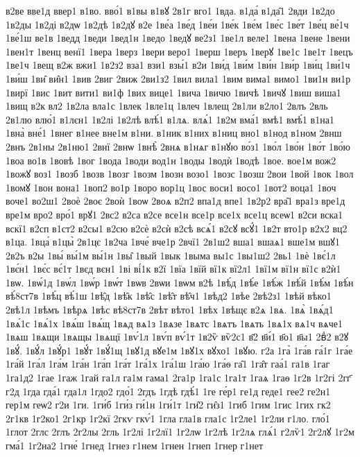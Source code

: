 {в2ве
вве1д
ввер1
в1во.
вво́1
в1вы
в1вꙋ
2в1г
вго1
1вда.
в1да́
в1да̑1
2вди
1в2до
1в2ды
1в2ді
в2дѡ
1в2дѣ
1в2дꙋ
в2е
1ве́а
1ве́д
1ве́и
1ве́к
1ве́м
1ве́с
1ве́т
1ве́ц
ве́1ч
1ве́1ш
ве1в
1ведд
1веди
1вед1н
1ведо
1ведꙋ
ве2з1
1ве1л
веле1
1вена
1вене
1вени
1вен1т
1венц
венї1
1вера
1верз
1вери
веро1
1верш
1веръ
1верꙋ
1ве1с
1ве1т
1вецъ
1ве1ч
1вещ
в2ж
вжи1
1в2з2
вза1
взи1
взы́1
в2и
1ви́д
1ви́м
1ви́н
1ви́р
1ви́ц
1ви́1ч
1ви́ш
1ви̑
ви̑н1
1вив
2виг
2виж
2ви1з2
1вил
вила1
1вим
вима1
вимо1
1ви1н
ви1р
1вирї
1вис
1вит
вити1
ви1ф
1вих
вице1
1вича
1вичю
1вичѣ
1вичꙋ
1виш
виша1
1вищ
в2к
вл2
1в2ла
вла1с
1влек
1вле1ц
1влеч
1влещ
2в1ли
в2ло1
2влъ
2вль
2в1лю
влю́1
в1лєн1
1в2лі
1в2лѣ
влѣ́1
в1лѧ.
влѧ́1
1в2м
вма́1
вмѣ1
вмѣ́1
в1на1
1вна̀
вне́1
1внег
в1нее
вне1м
в1ни.
в1ник
в1них
в1ниц
вно1
в1нод
в1ном
2внш
2внъ
2в1ны
2в1ню1
2внї
2внѡ
1внѣ̀
2внѧ
в1нѧг
в1нꙋю
во́з1
1во́л
1во́н
1во́т
1во́ю
1воа
во1в
1вовѣ
1вог
1вода
1води
вод1н
1воды
1водѝ
1водѣ
1вое.
вое1м
вож2
1вожꙋ
воз1
1возб
1возв
1возг
1возм
1возн
возо1
1возс
1возш
2вои
1вой
1вок
1вол
1вомꙋ
1вон
вона1
1воп2
во1р
1воро
вор1ц
1вос
воси1
восо1
1вот2
воца1
1воч
воче1
во2ш1
2воѐ
2воє
2воѝ
1воѡ
2воѧ
в2п2
впа1д
впе1
1в2р2
вра̑1
вра1з
вре1д
вре1м
вро2
вро́1
врꙋ1
2вс2
в2са
в2се
все1н
все1р
все1х
все1ц
всеѡ1
в2си
вска1
вскї1
в2сп
в1ст2
в2сы1
в2сю
в2сѐ
в2сѝ
в2сѣ
всѧ́1
в2сꙋ
всꙋ́1
1в2т
вто1р
в2х2
вц2
в1ца.
1вца́
в1цы̀
2в1цє
1в2ча
1вче́
вче1р
2вчї1
2в1ш2
вша1
вшаѧ1
вше1м
вшꙋ1
2в2ъ
в2ы
1вы́
вы́1м
вы́1н
1вы̑
1вый
1вык
1выма
вы1с
1вы1ш2
2вь1
1вѐ
1вє́1л
1вє́н1
1вє́с
вє́1т
1вєд
вєн1
1ві
ві́1к
в2ї
1вїа
1вїй
вї1к
вї2л1
1вї1м
вї1н
вї1с
в2ѝ1
1вѡ.
1вѡ́1д
1вѡ́л
1вѡ́р
1вѡ́т
1вѡв
2вѡи
1вѡм
в2ѣ
1вѣ́д
1вѣ́е
1вѣ́ж
1вѣ́й
1вѣ́м
1вѣ́н
вѣ́8ст7в
1вѣ́ц
вѣ́1ш
1вѣ̑д
1вѣ̑к
1вѣ̑с
1вѣ̑т
вѣ̑ч1
1вѣд2
1вѣе
2вѣ2з1
1вѣй
вѣко1
2вѣ1л
1вѣмъ
1вѣрѧ
1вѣс
вѣ8ст7в
2вѣт
вѣто1
1вѣх
1вѣщє
в2ѧ
1вѧ.
1вѧ̀
1вѧ́д1
1вѧ́1с
1вѧ́1х
1вѧ́ш
1вѧ́щ
1вѧд
вѧ1з
1вѧзе
1вѧтс
1вѧтъ
1вѧть
1вѧ1х
вѧ1ч
вѧче1
1вѧш
1вѧщи
1вѧщы
1вѧщї
1вѵ́1л
1вѵ́п
вѵ́1т
1в2ѷ
вѷ2с1
в҃2
в҃и́1
в҃о1
в҃ы1
2вⷣ2
в2ꙋ
1вꙋ́.
1вꙋ́л
1вꙋ́р1
1вꙋ́т
1вꙋ́1щ
1вꙋ1д
вꙋе1м
1вꙋ1х
вꙋхо1
1вꙋю.
г2а
1га̀
1га́в
га́1г
1га́е
1га́й
1га́л
1га́м
1га́н
1га́п
1га́т
1га́1х
1га́1ш
1га́ю
1га́ѳ
га̑1
1га̑т
гаа́1
га1в
1гаг
1га1д2
1гае
1гаж
1гай
га1л
га1м
гама1
2га1р
1га1с
1га1т
1гаѧ
1гаѳ
1г2в
1г2гі
2гг҃
г2д
1гда
гда́1
гда1л
1гдо2
гдо́1
2гдъ
1гдѣ
гдѣ́1
1ге
ге́р1
ге1д
геде1
гее2
ге2н1
гер1м
геѡ2
г2и
1ги.
1ги́б
1ги́з
ги́1н
1ги́1т
1ги̑2
ги̑з1
1гиб
1гим
1гис
1гих
гк2
2г1кв
1г2ко1
2г1кр
1г2кї
2гкѵ
гкѵ́1
1гла
гла1в
гла1с
1г2ле1
1г2ли
г1ло.
гло́1
1глот
2глс
2глъ
2г2лы
2гль
1г2лі
1г2лї1
1г2лѡ
1г2лѣ
1г2лѧ
глѧ́1
г2лѷ1
2г2лꙋ
1г2м
гма́1
1г2на2
1гне́
1гнед
1гнез
г1нем
1гнен
1гнеп
1гнер
г1нет
}
